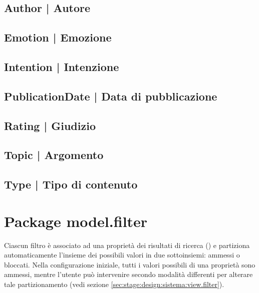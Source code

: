 \documentclass[10pt,a4paper,headinclude,footinclude,hidelinks]{scrreprt} %
\begin{document}
	\subsection[Author]{Author | Autore}
	\label{sec:stage:design:sistema:model.criteria:author}

	\subsection[Emotion]{Emotion | Emozione}
	\label{sec:stage:design:sistema:model.criteria:emotion}

	\subsection[Intention]{Intention | Intenzione}
	\label{sec:stage:design:sistema:model.criteria:intention}

	\subsection[PublicationDate]{PublicationDate | Data di pubblicazione}
	\label{sec:stage:design:sistema:model.criteria:publication-date}

	\subsection[Rating]{Rating | Giudizio}
	\label{sec:stage:design:sistema:model.criteria:rating}

	\subsection[Topic]{Topic | Argomento}
	\label{sec:stage:design:sistema:model.criteria:topic}

	\subsection[Type]{Type | Tipo di contenuto}
	\label{sec:stage:design:sistema:model.criteria:type}

	\section{Package model.filter}
	\label{sec:stage:design:sistema:model.filter}
	Ciascun filtro è associato ad una proprietà dei risultati di ricerca () e partiziona automaticamente l'insieme dei possibili valori in due sottoinsiemi: ammessi o bloccati. Nella configurazione iniziale, tutti i valori possibili di una proprietà sono ammessi, mentre l'utente può intervenire secondo modalità differenti per alterare tale partizionamento (vedi sezione \ref{sec:stage:design:sistema:view.filter}).
	
\end{document}
